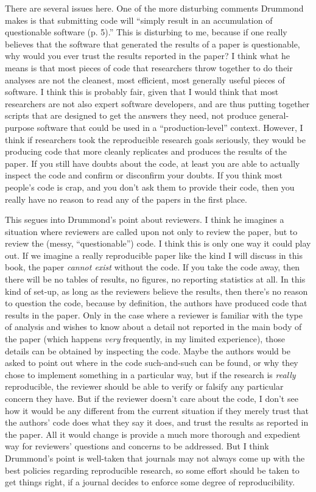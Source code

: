 \documentclass{book}
\begin{document}
There are several issues here.  One of the more disturbing comments Drummond makes is that submitting code will ``simply result in an accumulation of questionable software (p. 5).'' This is disturbing to me, because if one really believes that the software that generated the results of a paper is questionable, why would you ever trust the results reported in the paper?  I think what he means is that most pieces of code that researchers throw together to do their analyses are not the cleanest, most efficient, most generally useful pieces of software.  I think this is probably fair, given that I would think that most researchers are not also expert software developers, and are thus putting together scripts that are designed to get the answers they need, not produce general-purpose software that could be used in a ``production-level'' context. However, I think if researchers took the reproducible research goals seriously, they would be producing code that more cleanly replicates and produces the results of the paper.  If you still have doubts about the code, at least you are able to actually inspect the code and confirm or disconfirm your doubts. If you think most people's code is crap, and you don't ask them to provide their code, then you really have no reason to read any of the papers in the first place.

This segues into Drummond's point about reviewers. I think he imagines a situation where reviewers are called upon not only to review the paper, but to review the (messy, ``questionable'') code. I think this is only one way it could play out. If we imagine a really reproducible paper like the kind I will discuss in this book, the paper \emph{cannot exist} without the code. If you take the code away, then there will be no tables of results, no figures, no reporting statistics at all.  In this kind of set-up, as long as the reviewers believe the results, then there's no reason to question the code, because by definition, the authors have produced code that results in the paper. Only in the case where a reviewer is familiar with the type of analysis and wishes to know about a detail not reported in the main body of the paper (which happens \emph{very} frequently, in my limited experience), those details can be obtained by inspecting the code. Maybe the authors would be asked to point out where in the code such-and-such can be found, or why they chose to implement something in a particular way, but if the research is \emph{really} reproducible, the reviewer should be able to verify or falsify any particular concern they have.  But if the reviewer doesn't care about the code, I don't see how it would be any different from the current situation if they merely trust that the authors' code does what they say it does, and trust the results as reported in the paper. All it would change is provide a much more thorough and expedient way for reviewers' questions and concerns to be addressed.  But I think Drummond's point is well-taken that journals may not always come up with the best policies regarding reproducible research, so some effort should be taken to get things right, if a journal decides to enforce some degree of reproducibility.
\end{document}
